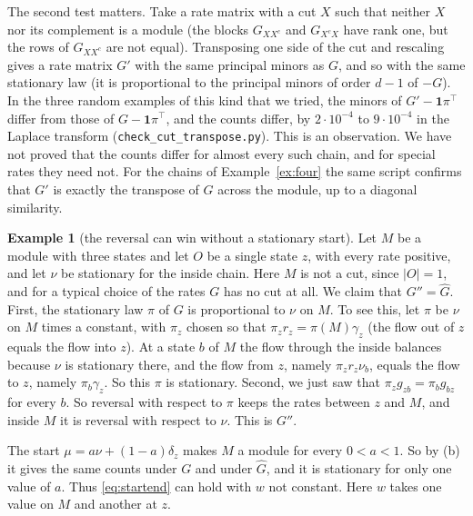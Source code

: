 \documentclass[11pt]{article}
\theoremstyle{definition}
\newtheorem{example}[theorem]{Example}
\theoremstyle{remark}
\newcommand{\one}{\mathbf 1}
\begin{document}
The second test matters. Take a rate matrix with a cut $X$ such that neither $X$ nor its complement is a
module (the blocks $G_{XX^c}$ and $G_{X^cX}$ have rank one, but the rows of
$G_{XX^c}$ are not equal). Transposing one side of the cut and rescaling gives a
rate matrix $G'$ with the same principal minors as $G$, and so with the same
stationary law (it is proportional to the principal minors of order $d-1$ of
$-G$). In the three random examples of this kind that we tried, the minors of
$G'-\one\pi^{\top}$ differ from those of $G-\one\pi^{\top}$, and the counts differ, by
$2\cdot10^{-4}$ to $9\cdot10^{-4}$ in the Laplace transform
(\texttt{check\_cut\_transpose.py}). This is an observation. We have not proved that the counts
differ for almost every such chain, and for special rates they need not. For the chains of
Example~\ref{ex:four} the same script confirms that $G'$ is exactly the
transpose of $G$ across the module, up to a diagonal similarity.

\begin{example}[the reversal can win without a stationary start]\label{ex:inside}
Let $M$ be a module with three states and let $O$ be a single state $z$, with
every rate positive, and let $\nu$ be stationary for the inside chain. Here $M$
is not a cut,
since $|O|=1$, and for a typical choice of the rates $G$ has no cut at all.
We claim that $G''=\hat G$. First, the stationary law $\pi$ of $G$ is
proportional to $\nu$ on $M$. To see this, let $\pi$ be $\nu$ on $M$ times a
constant, with $\pi_z$ chosen so that $\pi_zr_z=\pi(M)\gamma_z$ (the flow out
of $z$ equals the flow into $z$). At a state $b$ of $M$ the flow through the
inside balances because $\nu$ is stationary there, and the flow from $z$,
namely $\pi_zr_z\nu_b$, equals the flow to $z$, namely $\pi_b\gamma_z$. So this
$\pi$ is stationary. Second, we just saw that
$\pi_zg_{zb}=\pi_bg_{bz}$ for every $b$. So reversal with respect to $\pi$
keeps the rates between $z$ and $M$, and inside $M$ it is reversal with respect
to $\nu$. This is $G''$.

The start $\mu=a\nu+(1-a)\delta_z$ makes $M$ a module for every $0<a<1$. So by
(b) it gives the same counts under $G$ and under $\hat G$, and it is stationary
for only one value of $a$. Thus \eqref{eq:startend} can hold with $w$ not
constant. Here $w$ takes one value on $M$ and another at $z$.
\end{example}
\end{document}
